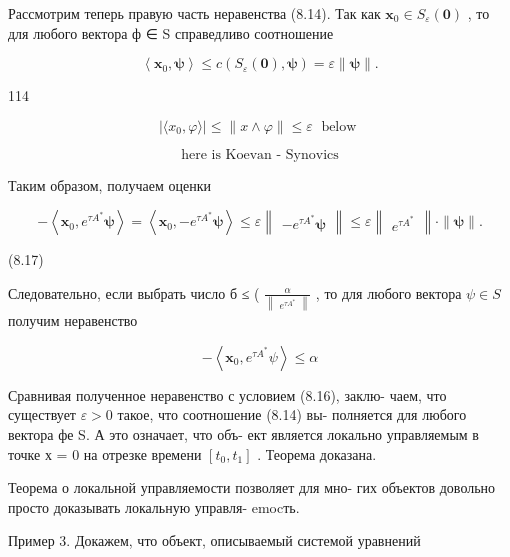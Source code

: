 \documentclass[8pt]{extarticle}
\begin{document}
Рассмотрим теперь правую часть неравенства (8.14). Так как \({\mathbf{x}}_{0} \in  {S}_{\varepsilon }\left( \mathbf{0}\right)\) , то для любого вектора ф ∈ S справедливо соотношение

\[
\left\langle  {{\mathbf{x}}_{0},\mathbf{\psi }}\right\rangle   \leq  c\left( {{S}_{\varepsilon }\left( \mathbf{0}\right) ,\mathbf{\psi }}\right)  = \varepsilon \parallel \mathbf{\psi }\parallel .
\]

114

\[
\left| {\langle {x}_{0},\varphi \rangle }\right|  \leq  \parallel x \land  \varphi \parallel  \leq  \varepsilon \;\text{ below }
\]

\[
\text{ here is Koevan - Synovics }
\]

Таким образом, получаем оценки

\[
- \left\langle  {{\mathbf{x}}_{0},{e}^{\tau {A}^{ * }}\mathbf{\psi }}\right\rangle   = \left\langle  {{\mathbf{x}}_{0}, - {e}^{\tau {A}^{ * }}\mathbf{\psi }}\right\rangle   \leq  \varepsilon \left\lVert \begin{array}{c} {-{e}^{\tau {A}^{ * }}\mathbf{\psi }} \end{array} \right\rVert \leq  \varepsilon \left\lVert \begin{array}{c} {e}^{\tau {A}^{ * }} \end{array} \right\rVert \cdot  \parallel \mathbf{\psi }\parallel .
\]

(8.17)

Следовательно, если выбрать число б ≤ ( \(\frac{\alpha }{\left\lVert \begin{array}{c} {e}^{\tau {A}^{ * }} \end{array} \right\rVert}\) , то для любого вектора \(\psi  \in  S\) получим неравенство

\[
- \left\langle  {{\mathbf{x}}_{0},{e}^{\tau {A}^{ * }}\psi }\right\rangle   \leq  \alpha
\]

Сравнивая полученное неравенство с условием (8.16), заклю- чаем, что существует \(\varepsilon  > 0\) такое, что соотношение (8.14) вы- полняется для любого вектора фе S. А это означает, что объ- ект является локально управляемым в точке х = 0 на отрезке времени \(\left\lbrack  {{t}_{0},{t}_{1}}\right\rbrack\) . Теорема доказана.

Теорема о локальной управляемости позволяет для мно- гих объектов довольно просто доказывать локальную управля- emocть.

Пример 3. Докажем, что объект, описываемый системой уравнений
\end{document}
